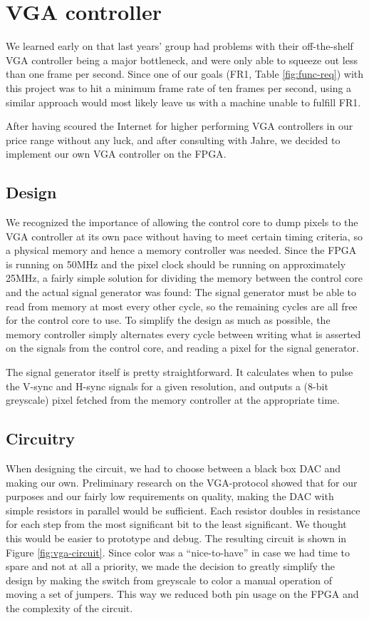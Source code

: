 \section{VGA controller}

We learned early on that last years' group had problems with their off-the-shelf
\ac{VGA} controller being a major bottleneck, and were only able to squeeze out
less than one frame per second. Since one of our goals (FR1, Table
\ref{fig:func-req}) with this project was to hit a minimum frame rate of ten
frames per second, using a similar approach would most likely leave us with a
machine unable to fulfill FR1.

After having scoured the Internet for higher performing \ac{VGA} controllers in our
price range without any luck, and after consulting with Jahre, we decided to
implement our own \ac{VGA} controller on the \ac{FPGA}.



\subsection{Design}
We recognized the importance of allowing the control core to dump pixels to the
\ac{VGA} controller at its own pace without having to meet certain timing criteria,
so a physical memory and hence a memory controller was needed. Since the \ac{FPGA}
is running on 50MHz and the pixel clock should be running on approximately
25MHz, a fairly simple solution for dividing the memory between the control
core and the actual signal generator was found: The signal generator must be
able to read from memory at most every other cycle, so the remaining cycles are
all free for the control core to use. To simplify the design as much as
possible, the memory controller simply alternates every cycle between writing
what is asserted on the signals from the control core, and reading a pixel
for the signal generator.

The signal generator itself is pretty straightforward. It calculates
when to pulse the V-sync and H-sync signals for a given resolution, and outputs
a (8-bit greyscale) pixel fetched from the memory controller at the appropriate
time.

\subsection{Circuitry}
 

When designing the circuit, we had to choose between a black box \ac{DAC} and
making our own. Preliminary research on the \ac{VGA}-protocol showed that for
our purposes and our fairly low requirements on quality, making the \ac{DAC}
with simple resistors in parallel would be sufficient. Each resistor doubles in
resistance for each step from the most significant bit to the least
significant. We thought this would be easier to prototype and debug. The
resulting circuit is shown in Figure \ref{fig:vga-circuit}. Since color was a
``nice-to-have'' in case we had time to spare and not at all a priority, we made
the decision to greatly simplify the design by making the switch from greyscale
to color a manual operation of moving a set of jumpers. This way we reduced both
pin usage on the \ac{FPGA} and the complexity of the circuit.
